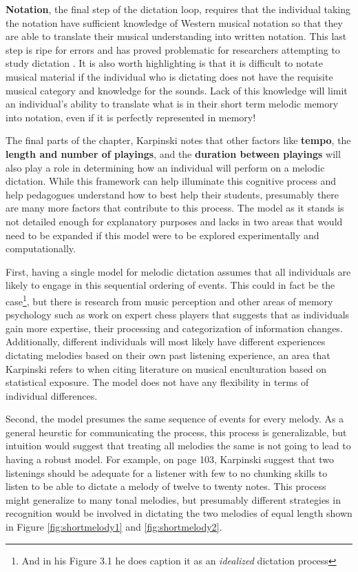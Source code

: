 \documentclass[]{book}
\let\rmarkdownfootnote\footnote%
\def\footnote{\protect\rmarkdownfootnote}
\theoremstyle{definition}
\theoremstyle{definition}
\theoremstyle{definition}
\theoremstyle{remark}
\begin{document}
\textbf{Notation}, the final step of the dictation loop, requires that
the individual taking the notation have sufficient knowledge of Western
musical notation so that they are able to translate their musical
understanding into written notation. This last step is ripe for errors
and has proved problematic for researchers attempting to study dictation
\citep{taylorStrategiesMemoryShort1983, klonoskiImprovingDictationAuralSkills2006}.
It is also worth highlighting is that it is difficult to notate musical
material if the individual who is dictating does not have the requisite
musical category and knowledge for the sounds. Lack of this knowledge
will limit an individual's ability to translate what is in their short
term melodic memory into notation, even if it is perfectly represented
in memory!

The final parts of the chapter, Karpinski notes that other factors like
\textbf{tempo}, the \textbf{length and number of playings}, and the
\textbf{duration between playings} will also play a role in determining
how an individual will perform on a melodic dictation. While this
framework can help illuminate this cognitive process and help pedagogues
understand how to best help their students, presumably there are many
more factors that contribute to this process. The model as it stands is
not detailed enough for explanatory purposes and lacks in two areas that
would need to be expanded if this model were to be explored
experimentally and computationally.

First, having a single model for melodic dictation assumes that all
individuals are likely to engage in this sequential ordering of events.
This could in fact be the case\footnote{And in his Figure 3.1 he does
  caption it as an \emph{idealized} dictation process}, but there is
research from music perception
\citep{goldmanImprovisationExperiencePredicts2018a} and other areas of
memory psychology such as work on expert chess players
\citep{laneChessKnowledgePredicts2018} that suggests that as individuals
gain more expertise, their processing and categorization of information
changes. Additionally, different individuals will most likely have
different experiences dictating melodies based on their own past
listening experience, an area that Karpinski refers to when citing
literature on musical enculturation based on statistical exposure. The
model does not have any flexibility in terms of individual differences.

Second, the model presumes the same sequence of events for every melody.
As a general heurstic for communicating the process, this process is
generalizable, but intuition would suggest that treating all melodies
the same is not going to lead to having a robust model. For example, on
page 103, Karpinski suggest that two listenings should be adequate for a
listener with few to no chunking skills to listen to be able to dictate
a melody of twelve to twenty notes. This process might generalize to
many tonal melodies, but presumably different strategies in recognition
would be involved in dictating the two melodies of equal length shown in
Figure \ref{fig:shortmelody1} and \ref{fig:shortmelody2}.
\end{document}
